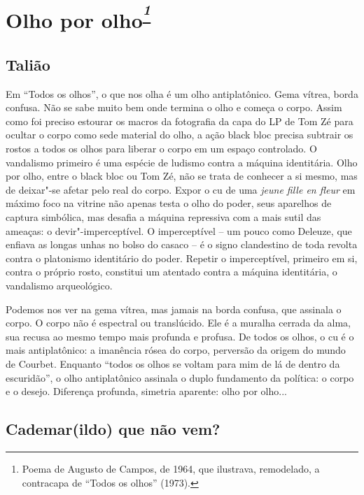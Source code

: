 \section{Olho por olho\textsuperscript{\emph{\footnote{Poema de Augusto de
  Campos, de 1964, que ilustrava, remodelado, a contracapa de ``Todos os
  olhos'' (1973).}}}}



\subsection{Talião}

Em ``Todos os olhos'', o que nos olha é um olho
antiplatônico. Gema vítrea, borda confusa. Não se sabe muito bem onde
termina o olho e começa o corpo. Assim como foi preciso estourar os
macros da fotografia da capa do LP de Tom Zé para ocultar o corpo como
sede material do olho, a ação black bloc precisa subtrair os rostos a
todos os olhos para liberar o corpo em um espaço controlado. O
vandalismo primeiro é uma espécie de ludismo contra a máquina
identitária. Olho por olho, entre o black bloc ou Tom Zé, não se trata
de conhecer a si mesmo, mas de deixar"-se afetar pelo real do corpo.
Expor o cu de uma \emph{jeune fille en fleur} em máximo foco na
vitrine não apenas testa o olho do poder, seus aparelhos de captura
simbólica, mas desafia a máquina repressiva com a mais sutil das
ameaças: o devir"-imperceptível. O imperceptível -- um pouco como
Deleuze, que enfiava as longas unhas no bolso do casaco -- é o signo
clandestino de toda revolta contra o platonismo identitário do poder.
Repetir o imperceptível, primeiro em si, contra o próprio rosto,
constitui um atentado contra a máquina identitária, o vandalismo
arqueológico.

Podemos nos ver na gema vítrea, mas jamais na borda confusa, que
assinala o corpo. O corpo não é espectral ou translúcido. Ele é a
muralha cerrada da alma, sua recusa ao mesmo tempo mais profunda e
profusa. De todos os olhos, o cu é o mais antiplatônico: a imanência
rósea do corpo, perversão da origem do mundo de Courbet. Enquanto
``todos os olhos se voltam para mim de lá de dentro da escuridão'', o
olho antiplatônico assinala o duplo fundamento da política: o corpo e o
desejo. Diferença profunda, simetria aparente: olho por olho...

\subsection{Cademar(ildo) que não vem?}

